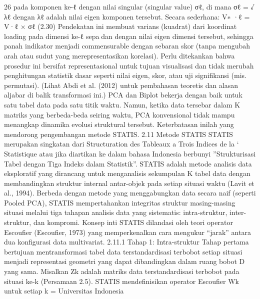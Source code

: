 26
pada komponen ke-ℓ dengan nilai singular (singular value) σℓ, di mana σℓ =
√
λℓ dengan
λℓ adalah nilai eigen komponen tersebut. Secara sederhana:
V∗
·ℓ = V·ℓ × σℓ (2.30)
Pendekatan ini membuat varians (kuadrat) dari koordinat loading pada dimensi ke-ℓ sepadan dengan nilai eigen dimensi tersebut, sehingga panah indikator menjadi commensurable
dengan sebaran skor (tanpa mengubah arah atau sudut yang merepresentasikan korelasi).
Perlu ditekankan bahwa prosedur ini bersifat representasional untuk tujuan visualisasi dan
tidak merubah penghitungan statistik dasar seperti nilai eigen, skor, atau uji signifikansi
(mis. permutasi). (Lihat Abdi et al. (2012) untuk pembahasan teoretis dan alasan aljabar
di balik transformasi ini.)
PCA dan Biplot bekerja dengan baik untuk satu tabel data pada satu titik waktu.
Namun, ketika data tersebar dalam K matriks yang berbeda-beda seiring waktu, PCA
konvensional tidak mampu menangkap dinamika evolusi struktural tersebut. Keterbatasan
inilah yang mendorong pengembangan metode STATIS.
2.11 Metode STATIS
STATIS merupakan singkatan dari Structuration des Tableaux a Trois Indices de la `
Statistique atau jika diartikan ke dalam bahasa Indonesia berbunyi ”Strukturisasi Tabel
dengan Tiga Indeks dalam Statistik”. STATIS adalah metode analisis data eksploratif yang
dirancang untuk menganalisis sekumpulan K tabel data dengan membandingkan struktur
internal antar-objek pada setiap situasi waktu (Lavit et al., 1994). Berbeda dengan metode
yang menggabungkan data secara naif (seperti Pooled PCA), STATIS mempertahankan
integritas struktur masing-masing situasi melalui tiga tahapan analisis data yang sistematis:
intra-struktur, inter-struktur, dan kompromi. Konsep inti STATIS dilandasi oleh teori
operator Escoufier (Escoufier, 1973) yang memperkenalkan cara mengukur “jarak” antara
dua konfigurasi data multivariat.
2.11.1 Tahap 1: Intra-struktur
Tahap pertama bertujuan mentransformasi tabel data terstandardisasi terbobot setiap
situasi menjadi representasi geometri yang dapat dibandingkan dalam ruang bobot D
yang sama. Misalkan Zk adalah matriks data terstandardisasi terbobot pada situasi ke-k
(Persamaan 2.5). STATIS mendefinisikan operator Escoufier Wk untuk setiap k =
Universitas Indonesia

